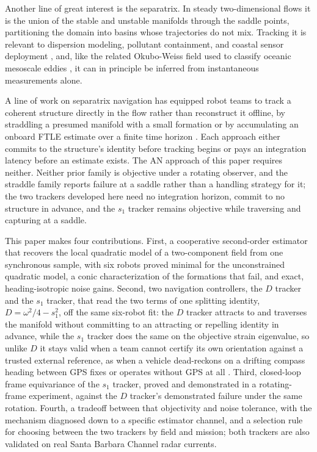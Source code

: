 \documentclass[lettersize,journal]{IEEEtran}
\begin{document}
Another line of great interest is the separatrix. In steady
two-dimensional flows it is the union of the stable and unstable
manifolds through the saddle points, partitioning the domain into
basins whose trajectories do not mix. Tracking it is relevant to
dispersion modeling, pollutant containment, and coastal sensor
deployment \cite{13,14,15}, and, like the related Okubo-Weiss field used
to classify oceanic mesoscale eddies \cite{16}, it can in principle be
inferred from instantaneous measurements alone.

A line of work on separatrix navigation has equipped robot teams to
track a coherent structure directly in the flow rather than
reconstruct it offline, by straddling a presumed manifold with a small
formation \cite{17,18,19,20} or by accumulating an onboard FTLE
estimate over a finite time horizon \cite{21}. Each approach either
commits to the structure's identity before tracking begins or pays an
integration latency before an estimate exists. The AN approach of this
paper requires neither. Neither prior family is objective under a
rotating observer, and the straddle family reports failure at a saddle
rather than a handling strategy for it; the two trackers developed here
need no integration horizon, commit to no structure in advance, and the
$s_1$ tracker remains objective while traversing and capturing at a
saddle.

This paper makes four contributions. First, a cooperative second-order
estimator that recovers the local quadratic model of a two-component
field from one synchronous sample, with six robots proved minimal for
the unconstrained quadratic model, a conic characterization of the
formations that fail, and exact, heading-isotropic noise gains. Second,
two navigation controllers, the $D$ tracker and the $s_1$ tracker, that
read the two terms of one splitting identity, $D = \omega^2/4 - s_1^2$,
off the same six-robot fit: the $D$ tracker attracts to and traverses
the manifold without committing to an attracting or repelling identity
in advance, while the $s_1$ tracker does the same on the objective
strain eigenvalue, so unlike $D$ it stays valid when a team cannot
certify its own orientation against a trusted external reference, as
when a vehicle dead-reckons on a drifting compass heading between GPS
fixes or operates without GPS at all \cite{10,22}. Third, closed-loop
frame equivariance of the $s_1$ tracker, proved and demonstrated in a
rotating-frame experiment, against the $D$ tracker's demonstrated
failure under the same rotation. Fourth, a tradeoff between that
objectivity and noise tolerance, with the mechanism diagnosed down to a
specific estimator channel, and a selection rule for choosing between
the two trackers by field and mission; both trackers are also validated
on real Santa Barbara Channel radar currents.
\end{document}
